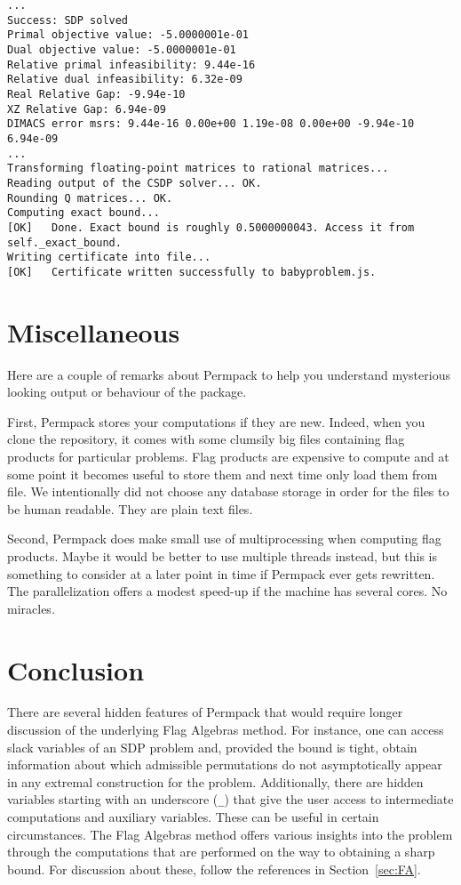 \documentclass[12pt, a4paper, twoside]{report}
\begin{document}
\begin{lstlisting}
...
Success: SDP solved
Primal objective value: -5.0000001e-01 
Dual objective value: -5.0000001e-01 
Relative primal infeasibility: 9.44e-16 
Relative dual infeasibility: 6.32e-09 
Real Relative Gap: -9.94e-10 
XZ Relative Gap: 6.94e-09 
DIMACS error msrs: 9.44e-16 0.00e+00 1.19e-08 0.00e+00 -9.94e-10 6.94e-09
...
Transforming floating-point matrices to rational matrices...
Reading output of the CSDP solver... OK.
Rounding Q matrices... OK.
Computing exact bound...
[OK]   Done. Exact bound is roughly 0.5000000043. Access it from
self._exact_bound.
Writing certificate into file... 
[OK]   Certificate written successfully to babyproblem.js.
\end{lstlisting}


\section{Miscellaneous}
\label{sec:permpack-misc}
Here are a couple of remarks about Permpack to help you understand mysterious looking output or behaviour of the package.

First, Permpack stores your computations if they are new. Indeed, when you clone the repository, it comes with some clumsily big files containing flag products for particular problems. Flag products are expensive to compute and at some point it becomes useful to store them and next time only load them from file. We intentionally did not choose any database storage in order for the files to be human readable. They are plain text files. 

Second, Permpack does make small use of multiprocessing when computing flag products. Maybe it would be better to use multiple threads instead, but this is something to consider at a later point in time if Permpack ever gets rewritten. The parallelization offers a modest speed-up if the machine has several cores. No miracles.

\section{Conclusion}

There are several hidden features of Permpack that would require longer discussion of the underlying Flag Algebras method. For instance, one can access slack variables of an SDP problem and, provided the bound is tight, obtain information about which admissible permutations do not asymptotically appear in any extremal construction for the problem. Additionally, there are hidden variables starting with an underscore (\texttt{\_}) that give the user access to intermediate computations and auxiliary variables. These can be useful in certain circumstances. The Flag Algebras method offers various insights into the problem through the computations that are performed on the way to obtaining a sharp bound. For discussion about these, follow the references in Section~\ref{sec:FA}. 
\end{document}
